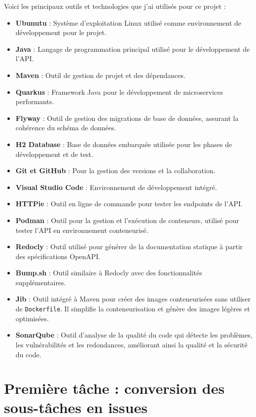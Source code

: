 \documentclass[11pt]{article}
\begin{document}
		Voici les principaux outils et technologies que j’ai utilisés pour ce projet :
	\begin{itemize}
		\item \textbf{Ubunutu} : Système d'exploitation Linux utilisé comme environnement de développement pour le projet.
		\item \textbf{Java} : Langage de programmation principal utilisé pour le développement de l'API.
		\item \textbf{Maven} : Outil de gestion de projet et des dépendances.
		\item \textbf{Quarkus} : Framework Java pour le développement de microservices performants.
		\item \textbf{Flyway} : Outil de gestion des migrations de base de données, assurant la cohérence du schéma de données.
		\item \textbf{H2 Database} : Base de données embarquée utilisée pour les phases de développement et de test.
		\item \textbf{Git et GitHub} : Pour la gestion des versions et la collaboration.
		\item \textbf{Visual Studio Code} : Environnement de développement intégré.
		\item \textbf{HTTPie} : Outil en ligne de commande pour tester les endpoints de l'API.
		\item \textbf{Podman} : Outil pour la gestion et l'exécution de conteneurs, utilisé pour tester l'API en environnement conteneurisé.
		\item \textbf{Redocly} : Outil utilisé pour générer de la documentation statique à partir des spécifications OpenAPI.
		\item\textbf{Bump.sh} : Outil similaire à Redocly avec des fonctionnalités supplémentaires.
		\item \textbf{Jib} : Outil intégré à Maven pour créer des images conteneurisées sans utiliser de \texttt{Dockerfile}. Il simplifie la conteneurisation et génère des images légères et optimisées.
		\item \textbf{SonarQube} : Outil d'analyse de la qualité du code qui détecte les problèmes, les vulnérabilités et les redondances, améliorant ainsi la qualité et la sécurité du code.
	\end{itemize}
		
		\section{Première tâche : conversion des sous-tâches en issues}
		
\end{document}
